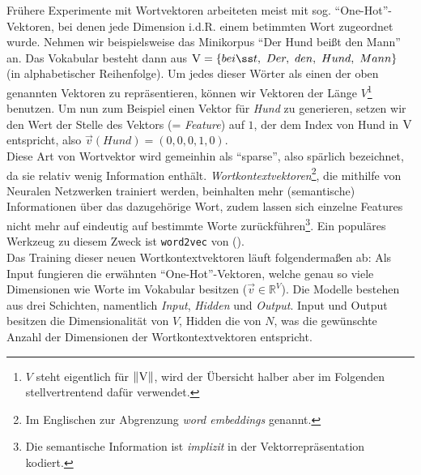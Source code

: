 Frühere Experimente mit Wortvektoren arbeiteten meist mit sog. ``One-Hot''-Vektoren, bei denen jede Dimension i.d.R.
einem betimmten Wort zugeordnet wurde. Nehmen wir beispielsweise das Minikorpus ``Der Hund beißt den Mann'' an.
Das Vokabular besteht dann aus $\textsc{V} = \{beißt,\ Der,\ den,\ Hund,\ Mann\}$ (in alphabetischer Reihenfolge).
Um jedes dieser Wörter als einen der oben genannten Vektoren zu repräsentieren, können wir Vektoren der Länge $V$\footnote{
$V$ steht eigentlich für $\|\textsc{V}\|$, wird der Übersicht halber aber im Folgenden stellvertrentend dafür verwendet.}
benutzen. Um nun zum Beispiel einen Vektor für \emph{Hund} zu generieren, setzen wir den Wert der Stelle des Vektors (=
\emph{Feature}) auf $1$, der dem Index von Hund in $\textsc{V}$ entspricht,
also $\vec{v}(Hund)=(0, 0, 0, 1, 0)$.\\
Diese Art von Wortvektor wird gemeinhin als ``sparse'', also spärlich bezeichnet, da sie relativ wenig Information enthält.
\emph{Wortkontextvektoren}\footnote{Im Englischen zur Abgrenzung \emph{word embeddings}
genannt.}, die mithilfe von Neuralen Netzwerken trainiert werden, beinhalten mehr (semantische) Informationen über das dazugehörige Wort, zudem lassen sich einzelne Features
nicht mehr auf eindeutig auf bestimmte Worte zurückführen\footnote{Die semantische Information ist \emph{implizit} in der
Vektorrepräsentation kodiert.}. Ein populäres Werkzeug zu diesem Zweck ist \verb|word2vec| von (\cite{mikolov2013efficient}).\\

Das Training dieser neuen Wortkontextvektoren läuft folgendermaßen ab:
Als Input fungieren die erwähnten ``One-Hot''-Vektoren, welche genau so viele Dimensionen wie Worte im Vokabular besitzen
($\vec{v} \in \mathbb{R}^V$).
Die Modelle bestehen aus drei Schichten, namentlich \emph{Input}, \emph{Hidden} und \emph{Output}.
Input und Output besitzen die Dimensionalität von $V$, Hidden die von $N$, was die gewünschte Anzahl der Dimensionen der
Wortkontextvektoren entspricht.\\

